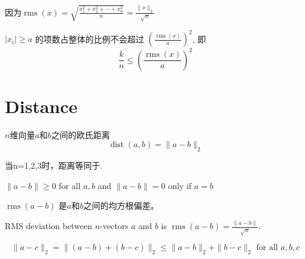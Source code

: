 \begin{corollary}
    因为$ \operatorname{rms}(x)=\sqrt{\frac{x_{1}^{2}+x_{2}^{2}+\cdots+x_{n}^{2}}{n}}=\frac{\|x\|_{2}}{\sqrt{n}} $

    $ \left|x_{i}\right| \geq a $ 的项数占整体的比例不会超过 $ \left(\frac{\operatorname{rms}(x)}{a}\right)^{2} $, 即 \begin{equation} \frac{k}{n} \leq\left(\frac{\operatorname{rms}(x)}{a}\right)^{2} \end{equation}
\end{corollary}

\section{Distance}

\begin{definition}
    $n$维向量$a$和$b$之间的欧氏距离
    \begin{equation} \operatorname{dist}(a, b)=\|a-b\|_{2} \end{equation}
\end{definition}

当n=1,2,3时，距离等同于.

\begin{theorem}
    $ \|a-b\| \geq 0 $ for all $ a, b $ and $ \|a-b\|=0 $ only if $ a=b $
\end{theorem}

\begin{definition}
    $ \operatorname{rms}(a-b) $ 是$a$和$b$之间的均方根偏差。
\end{definition}

\begin{corollary}
    RMS deviation between $ n $-vectors $ a $ and $ b $ is $ \operatorname{rms}(a-b)=\frac{\|a-b\|}{\sqrt{n}} $.
\end{corollary}

\begin{theorem}
    \begin{equation} \|a-c\|_{2}=\|(a-b)+(b-c)\|_{2} \leq\|a-b\|_{2}+\|b-c\|_{2} \text{ for all } a, b, c \end{equation}
\end{theorem}

